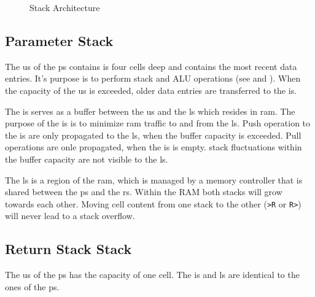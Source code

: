 \begin{figure}[!h]
\begin{center}
{{
    }
  }
  \caption{Stack Architecture}
  \label{stacks:fig}
  \end{center}
\end{figure}

\subsection{Parameter Stack}
\label{stacks:ps}

The \gls{us} of the \gls{ps} contains is four \glspl{cell} deep and contains the
most recent data entries. It's purpose is to perform stack and ALU operations
(see  and ).
When the capacity of the \gls{us} is exceeded, older data entries are transferred
to the \gls{is}.

The \gls{is} serves as a buffer between the \gls{us} and the \gls{ls} which resides
in \gls{ram}. The purpose of the \gls{is} is to minimize \gls{ram} traffic to and
from the \gls{ls}.
Push operation to the \gls{is} are only propagated to the \gls{ls}, when the buffer
capacity is exceeded. Pull operations are onle propagated, when the \gls{is} is empty.
\Gls{stack} fluctuations within the buffer capacity are not visible to the \gls{ls}.

The \gls{ls} is a region of the \gls{ram}, which is managed by a memory controller
that is shared between the \gls{ps} and the \gls{rs}. Within the RAM both stacks will
grow towards each other. Moving cell content from one stack to the other (\texttt{>R} 
or \texttt{R>}) will never lead to a stack overflow. 

\subsection{Return Stack Stack}
\label{stacks:ps}

The \gls{us} of the \gls{ps} has the capacity of one \gls{cell}. The \gls{is} and
\gls{ls} are identical to the ones of the \gls{ps}.
